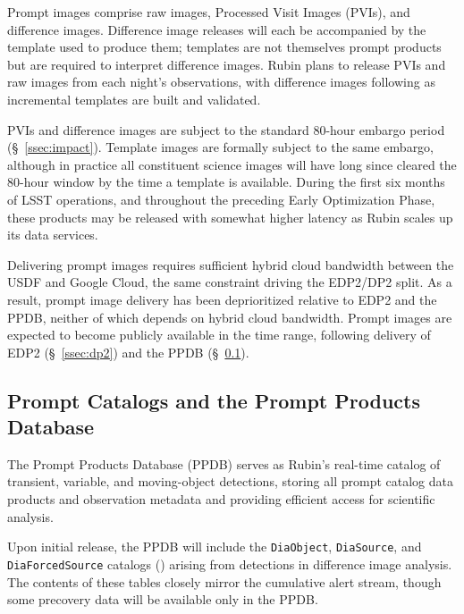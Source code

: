 Prompt images comprise raw images, Processed Visit Images (PVIs), and difference images.
Difference image releases will each be accompanied by the template used to produce them; templates are not themselves prompt products but are required to interpret difference images.
Rubin plans to release PVIs and raw images from each night's observations, with difference images following as incremental templates are built and validated.

PVIs and difference images are subject to the standard 80-hour embargo period (\S~\ref{ssec:impact}).
Template images are formally subject to the same embargo, although in practice all constituent science images will have long since cleared the 80-hour window by the time a template is available.
During the first six months of LSST operations, and throughout the preceding Early Optimization Phase, these products may be released with somewhat higher latency as Rubin scales up its data services.

Delivering prompt images requires sufficient hybrid cloud bandwidth between the USDF and Google Cloud, the same constraint driving the EDP2/DP2 split.
As a result, prompt image delivery has been deprioritized relative to EDP2 and the PPDB, neither of which depends on hybrid cloud bandwidth.
Prompt images are expected to become publicly available in the \npcdate time range, following delivery of EDP2 (\S~\ref{ssec:dp2}) and the PPDB (\S~\ref{ssec:ppdb}).

\subsection{Prompt Catalogs and the Prompt Products Database}
\label{ssec:ppdb}

The Prompt Products Database (PPDB) serves as Rubin's real-time catalog of transient, variable, and moving-object detections, storing all prompt catalog data products and observation metadata and providing efficient access for scientific analysis.

Upon initial release, the PPDB will include the \texttt{DiaObject}, \texttt{DiaSource}, and \texttt{DiaForcedSource}
catalogs () arising from detections in difference image analysis.
The contents of these tables closely mirror the cumulative alert stream,
though some precovery data will be available only in the PPDB.

